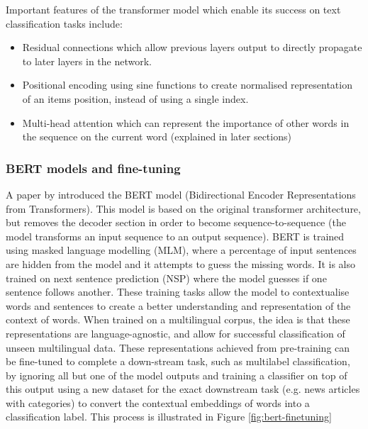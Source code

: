 \documentclass{l4proj}
\begin{document}
Important features of the transformer model which enable its success on text classification tasks include:
\begin{itemize}
    \item Residual connections which allow previous layers output to directly propagate to later layers in the network.
    \item Positional encoding using sine functions to create normalised representation of an items position, instead of using a single index.
    \item Multi-head attention which can represent the importance of other words in the sequence on the current word (explained in later sections)
\end{itemize}

\subsubsection{BERT models and fine-tuning} \hfill \par
A paper by \cite{devlin2018bert} introduced the BERT model (Bidirectional Encoder Representations from Transformers). This model is based on the original transformer architecture, but removes the decoder section in order to become sequence-to-sequence (the model transforms an input sequence to an output sequence). BERT is trained using masked language modelling (MLM), where a percentage of input sentences are hidden from the model and it attempts to guess the missing words. It is also trained on next sentence prediction (NSP) where the model guesses if one sentence follows another. These training tasks allow the model to contextualise words and sentences to create a better understanding and representation of the context of words. When trained on a multilingual corpus, the idea is that these representations are language-agnostic, and allow for successful classification of unseen multilingual data. These representations achieved from pre-training can be fine-tuned to complete a down-stream task, such as multilabel classification, by ignoring all but one of the model outputs and training a classifier on top of this output using a new dataset for the exact downstream task (e.g. news articles with categories) to convert the contextual embeddings of words into a classification label. This process is illustrated in Figure \ref{fig:bert-finetuning}
\end{document}
